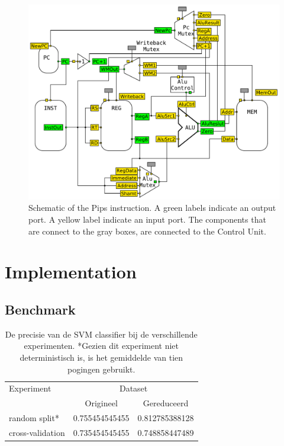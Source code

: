 \documentclass[a4paper,12pt]{article}
\begin{document}
\begin{figure}[h!]
    \centering
    \includegraphics[width=\textwidth]{pips.pdf}
    \caption{Schematic of the Pips instruction. A green labels indicate an
      output port. A yellow label indicate an input port. The components that
      are connect to the gray boxes, are connected to the Control Unit.}
    \label{pips-schematic}
\end{figure}

\section{Implementation}

\subsection{Benchmark}
\begin{table}[h]
    \begin{tabular}{ l c c }
    
    Experiment& \multicolumn{2}{c}{Dataset} \\
    & Origineel & Gereduceerd \\
    \hline
    random split*    & 0.755454545455 & 0.812785388128 \\ 
    cross-validation & 0.735454545455 & 0.748858447489 
    
    \end{tabular}
    \centering
    \caption{De precisie van de SVM classifier bij de verschillende experimenten. *Gezien dit experiment niet deterministisch is, is het gemiddelde van tien pogingen gebruikt.}
    \label{accuracy}
\end{table}
\end{document}
